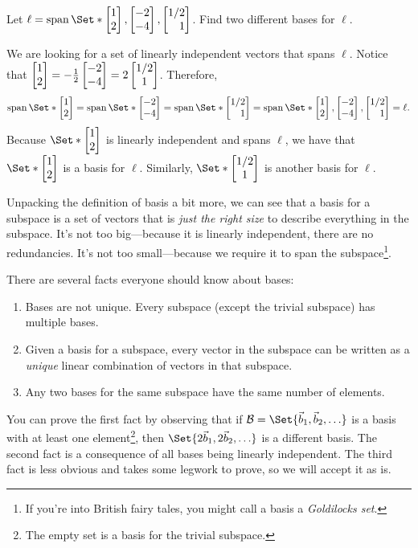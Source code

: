 \begin{example}
	\label{EXLINEBASIS}
	Let $\ell=\Span\Set*{\mat{1\\2},\mat{-2\\-4}, \mat{1/2\\1}}$. Find
	two different bases for $\ell$.
	
	We are looking for a set of linearly independent vectors that spans $\ell$.
	Notice that $\mat{1\\2} = -\tfrac{1}{2}\mat{-2\\-4} = 2\matc{1/2\\1}$.
	Therefore,
    \[
		\Span\Set*{\mat{1\\2}} =
		\Span\Set*{\mat{-2\\-4}} =
		\Span\Set*{\mat{1/2\\1}} =
		\Span\Set*{\mat{1\\2},\mat{-2\\-4}, \mat{1/2\\1}} =
		\ell.
	\]
	Because $\Set*{\mat{1\\2}}$ is linearly independent and spans $\ell$,
	we have that $\Set*{\mat{1\\2}}$ is a basis for $\ell$.
	Similarly, $\Set*{\matc{1/2\\1}}$ is another basis for $\ell$.
\end{example}

Unpacking the definition of basis a bit more, we can see that 
a basis for a subspace
 is a set of vectors
that is \emph{just the right size} to describe everything in the subspace.
It's not too big---because it is linearly independent, there are no
redundancies. It's not too small---because we require it to span the subspace\footnote{ 
If you're into British fairy tales, you might call a basis a \emph{Goldilocks set}.
}.

There are several facts everyone should know about bases:
\begin{enumerate}
	\item Bases are not unique. Every subspace (except the trivial subspace)
		has multiple bases.
	\item Given a basis for a subspace, every vector in the subspace can be written
		as a \emph{unique} linear combination of vectors in that subspace.
	\item Any two bases for the same subspace have the same number of elements.
\end{enumerate}

You can prove the first fact by observing that if $\mathcal B=\Set{\vec b_1,\vec b_2,\ldots}$ is a basis
with at least one element\footnote{ The empty set is a basis for the trivial subspace.}, then
$\Set{2\vec b_1,2\vec b_2,\ldots}$ is a different basis. The second fact is a consequence of all bases 
being linearly independent. The third fact is less obvious and takes some legwork to prove, so we will accept it
as is.

